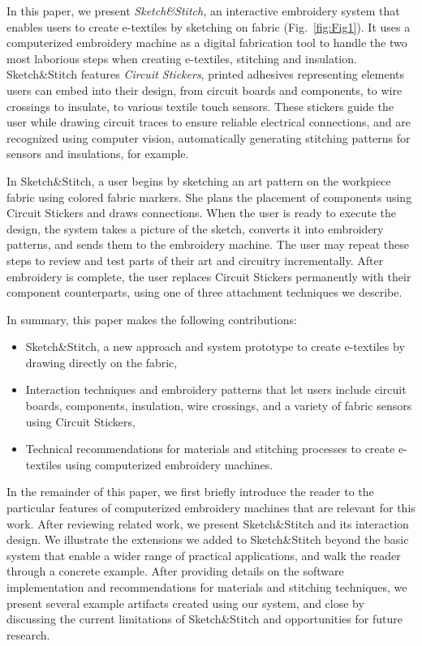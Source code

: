 \documentclass[header.tex]{subfiles}
\begin{document}
In this paper, we present \emph{Sketch\&Stitch,} an interactive embroidery system that enables users to create e-textiles by sketching on fabric (Fig.~\ref{fig:Fig1}). It uses a computerized embroidery machine as a digital fabrication tool to handle the two most laborious steps when creating e-textiles, stitching and insulation. Sketch\&Stitch features \textit{Circuit Stickers}, printed adhesives representing elements users can embed into their design, from circuit boards and components, to wire crossings to insulate, to various textile touch sensors. These stickers guide the user while drawing circuit traces to ensure reliable electrical connections, and are recognized using computer vision, automatically generating stitching patterns for sensors and insulations, for example.

In Sketch\&Stitch, a user begins by sketching an art pattern on the workpiece fabric using colored fabric markers. She plans the placement of components using Circuit Stickers and draws connections. When the user is ready to execute the design, the system takes a picture of the sketch, converts it into embroidery patterns, and sends them to the embroidery machine. 
The user may repeat these steps to review and test parts of their art and circuitry incrementally. After embroidery is complete, the user replaces Circuit Stickers permanently with their component counterparts, using one of three attachment techniques we describe.

In summary, this paper makes the following contributions:
\begin{itemize}
    \item Sketch\&Stitch, a new approach and system prototype to create e-textiles by drawing directly on the fabric,
    \item Interaction techniques and embroidery patterns that let users include circuit boards, components, insulation, wire crossings, and a variety of fabric sensors using Circuit Stickers,
    \item Technical recommendations for materials and stitching processes to create e-textiles using computerized embroidery machines.
\end{itemize}

In the remainder of this paper, we first briefly introduce the reader to the particular features of computerized embroidery machines that are relevant for this work. After reviewing related work, we present Sketch\&Stitch and its interaction design. We illustrate the extensions we added to Sketch\&Stitch beyond the basic system that enable a wider range of practical applications, and walk the reader through a concrete example. After providing details on the software implementation and recommendations for materials and stitching techniques, we present several example artifacts created using our system, and close by discussing the current limitations of Sketch\&Stitch and opportunities for future research.
\end{document}
